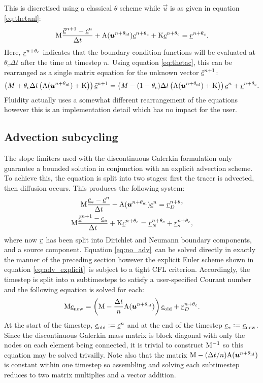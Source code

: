 This is discretised using a classical $\theta$ scheme while $\vec u$ is as
given in equation \eqref{eq:thetanl}:
\begin{equation}
  \mathrm{M} \frac{\underline{\tilde c}^{n+1}-\underline{c}^{n}}{\Delta t}
  +\mathrm{A}({\mbox{\boldmath$u$}}^{n+\theta_{\mathrm{nl}}})\underline{c}^{n+\theta_c}+\mathrm{K}\underline{c}^{n+\theta_c}=\underline{r}^{n+\theta_c}.
\end{equation}
Here, $\underline{r}^{n+\theta_c}$ indicates that the boundary condition
functions will be evaluated at $\theta_c\Delta t$ after the time at timestep
$n$. Using equation \eqref{eq:thetac}, this can be rearranged as a single
matrix equation for the unknown vector $\underline{\tilde c}^{n+1}$:
\begin{equation}
  \left(M+\theta_c\Delta t\left(\mathrm{A}({\mbox{\boldmath$u$}}^{n+\theta_{\mathrm{nl}}})+\mathrm{K}\right)\right)\underline{\tilde c}^{n+1}
  =\left(M-(1-\theta_c)\Delta
    t\left(\mathrm{A}({\mbox{\boldmath$u$}}^{n+\theta_{\mathrm{nl}}})+\mathrm{K}\right)\right)\underline{c}^{n} +\underline{r}^{n+\theta_c}.
\end{equation}
Fluidity actually uses a somewhat different rearrangement of the equations
however this is an implementation detail which has no impact for the user.

\subsection{Advection subcycling}

The slope limiters used with the discontinuous Galerkin formulation only
guarantee a bounded solution in conjunction with an explicit advection
scheme. To achieve this, the equation is split into two stages: first the
tracer is advected, then diffusion occurs. This produces the following
system:
\begin{gather}
  \mathrm{M} \frac{\underline{c}_*-\underline{c}^{n}}{\Delta t}
  +\mathrm{A}({\mbox{\boldmath$u$}}^{n+\theta_{\mathrm{nl}}})\underline{c}^{n}=\underline{r}_D^{n+\theta_c}\label{eq:adv_explicit}\\
  \mathrm{M} \frac{\underline{\tilde c}^{n+1}-\underline{c}_*}{\Delta t}
  +\mathrm{K}\underline{c}^{n+\theta_c}=\underline{r}_N^{n+\theta_c}+\underline{r}_s^{n+\theta_c}\label{eq:no_adv},
\end{gather}
where now $\underline{r}$ has been split into Dirichlet and Neumann boundary
components, and a source component. Equation \eqref{eq:no_adv}\ can be
solved directly in exactly the manner of the preceding section however the
explicit Euler scheme shown in equation \eqref{eq:adv_explicit}\ is subject
to a tight CFL criterion. Accordingly, the timestep is split into $n$
subtimesteps to satisfy a user-specified Courant number and the following
equation is solved for each:
\begin{equation}
  \mathrm{M} \underline{c}_\mathrm{new}=\left(\mathrm{M}-\frac{\Delta t}{n}\mathrm{A}({\mbox{\boldmath$u$}}^{n+\theta_{\mathrm{nl}}})\right) \underline{c}_\mathrm{old}+\underline{r}_D^{n+\theta_c}.
\end{equation}
At the start of the timestep, $\underline{c}_{\mathrm{old}}:=\underline{c}^{n}$ and at the
end of the timestep $\underline{c}_*:=\underline{c}_{\mathrm{new}}$.
Since the discontinuous Galerkin mass matrix is block diagonal with only the
nodes on each element being connected, it is trivial to construct
$\mathrm{M}^{-1}$ so this equation may be solved trivailly. Note also that the
matrix $\mathrm{M}-(\Delta t/n)\mathrm{A}({\mbox{\boldmath$u$}}^{n+\theta_{\mathrm{nl}}})$ is constant within one timestep
so assembling and solving each subtimestep reduces to two matrix
multiplies and a vector addition.

